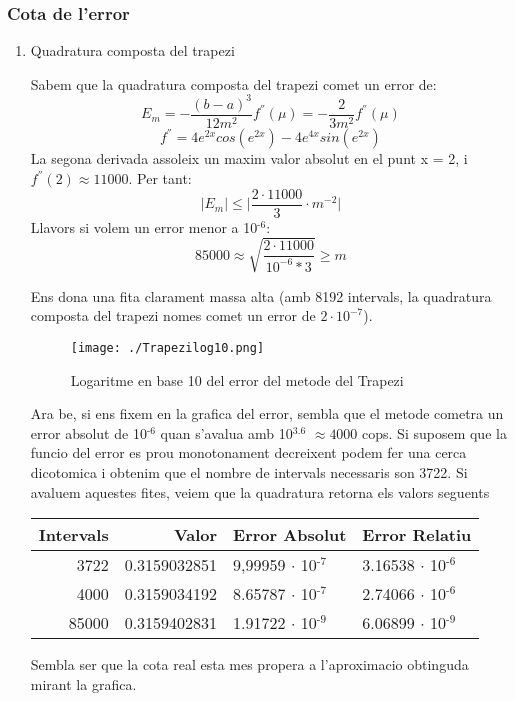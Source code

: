 \documentclass{article}
\begin{document}
\subsubsection{Cota de l'error}
\label{sec:orga7a8e4b}
\begin{enumerate}
\item Quadratura composta del trapezi
\label{sec:org48270c9}

Sabem que la quadratura composta del trapezi comet un error de: 
\[
 E_m = -\frac{(b-a)^3}{12m^2}f^{''}(\mu) =  -\frac{2}{3m^2}f^{''}(\mu) 
\]
\[
 f^{''} = 4e^{2x}cos(e^{2x}) - 4e^{4x}sin(e^{2x})
\]
La segona derivada assoleix un maxim valor absolut en el punt x = 2, i \(f^{''}(2) \approx 11000\). Per tant:
\[
\lvert E_m \rvert \leq \bigg\lvert \frac{2\cdot11000}{3} \cdot m^{-2} \bigg\rvert
\] 
Llavors si volem un error menor a 10\(^{\text{-6}}\):
\[
85000 \approx \sqrt{\frac{2\cdot11000}{10^{-6} * 3}} \geq m
\]

Ens dona una fita clarament massa alta (amb 8192 intervals, la quadratura composta del trapezi nomes comet un error de \(2\cdot10^{-7}\)).

\begin{figure}[htbp]
\centering
\texttt{[image: ./Trapezilog10.png]}
\caption{Logaritme en base 10 del error del metode del Trapezi}
\end{figure}

Ara be, si ens fixem en la grafica del error, sembla que el metode cometra un error absolut de 10\(^{\text{-6}}\) quan s'avalua amb 10\(^{\text{3.6}}\) \(\approx 4000\) cops.
Si suposem que la funcio del error es prou monotonament decreixent podem fer una cerca dicotomica i obtenim que el nombre de intervals necessaris son 3722.
Si avaluem aquestes fites, veiem que la quadratura retorna els valors seguents
\begin{center}
\begin{tabular}{rrll}
Intervals & Valor & Error Absolut & Error Relatiu\\
\hline
3722 & 0.3159032851 & 9,99959 \(\cdot\) 10\(^{\text{-7}}\) & 3.16538 \(\cdot\) 10\(^{\text{-6}}\)\\
4000 & 0.3159034192 & 8.65787 \(\cdot\) 10\(^{\text{-7}}\) & 2.74066 \(\cdot\) 10\(^{\text{-6}}\)\\
85000 & 0.3159402831 & 1.91722 \(\cdot\) 10\(^{\text{-9}}\) & 6.06899 \(\cdot\) 10\(^{\text{-9}}\)\\
\end{tabular}
\end{center}
Sembla ser que la cota real esta mes propera a l'aproximacio obtinguda mirant la grafica. 


\end{enumerate}
\end{document}
